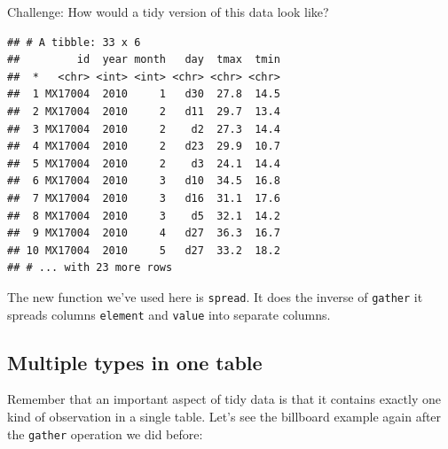 \documentclass[12pt,]{book}
\newenvironment{Shaded}{\begin{snugshade}}{\end{snugshade}}
\newcommand{\KeywordTok}[1]{\textcolor[rgb]{0.13,0.29,0.53}{\textbf{#1}}}
\newcommand{\DataTypeTok}[1]{\textcolor[rgb]{0.13,0.29,0.53}{#1}}
\newcommand{\StringTok}[1]{\textcolor[rgb]{0.31,0.60,0.02}{#1}}
\newcommand{\OtherTok}[1]{\textcolor[rgb]{0.56,0.35,0.01}{#1}}
\newcommand{\OperatorTok}[1]{\textcolor[rgb]{0.81,0.36,0.00}{\textbf{#1}}}
\newcommand{\NormalTok}[1]{#1}
\theoremstyle{definition}
\theoremstyle{definition}
\theoremstyle{remark}
\begin{document}
Challenge: How would a tidy version of this data look like?

\begin{Shaded}
\end{Shaded}

\begin{verbatim}
## # A tibble: 33 x 6
##         id  year month   day  tmax  tmin
##  *   <chr> <int> <int> <chr> <chr> <chr>
##  1 MX17004  2010     1   d30  27.8  14.5
##  2 MX17004  2010     2   d11  29.7  13.4
##  3 MX17004  2010     2    d2  27.3  14.4
##  4 MX17004  2010     2   d23  29.9  10.7
##  5 MX17004  2010     2    d3  24.1  14.4
##  6 MX17004  2010     3   d10  34.5  16.8
##  7 MX17004  2010     3   d16  31.1  17.6
##  8 MX17004  2010     3    d5  32.1  14.2
##  9 MX17004  2010     4   d27  36.3  16.7
## 10 MX17004  2010     5   d27  33.2  18.2
## # ... with 23 more rows
\end{verbatim}

The new function we've used here is \texttt{spread}. It does the inverse
of \texttt{gather} it spreads columns \texttt{element} and
\texttt{value} into separate columns.

\subsection{Multiple types in one
table}\label{multiple-types-in-one-table}

Remember that an important aspect of tidy data is that it contains
exactly one kind of observation in a single table. Let's see the
billboard example again after the \texttt{gather} operation we did
before:

\begin{Shaded}
\end{Shaded}
\end{document}
